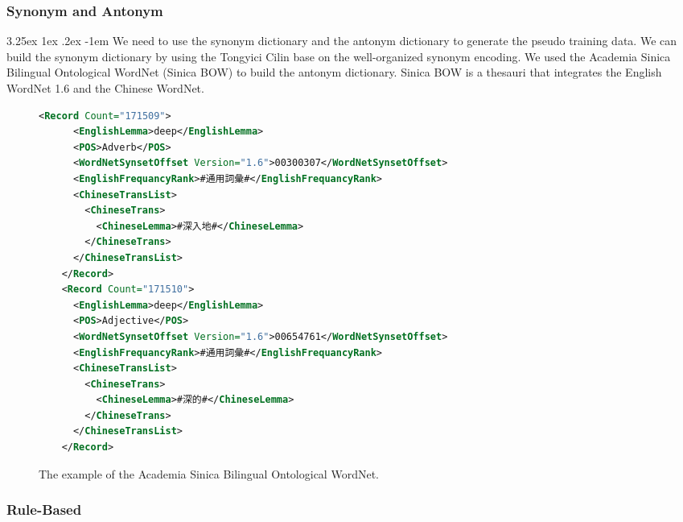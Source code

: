 \documentclass[12pt]{article}
\makeatletter
\renewcommand\paragraph{\@startsection{paragraph}{5}{\z@}%
  {3.25ex \@plus1ex \@minus.2ex}%
  {-1em}%
  {\normalfont\normalsize\bfseries}}
\makeatother
\begin{document}
\begin{CJK*}{UTF8}{bkai}
\begin{spacing}{1.77}
\subsubsection{Synonym and Antonym}
\paragraph{}
We need to use the synonym dictionary and the antonym dictionary to generate the pseudo training data. We can build the synonym dictionary by using the Tongyici Cilin base on the well-organized synonym encoding. We used the Academia Sinica Bilingual Ontological WordNet (Sinica BOW) \cite{huang2004sinica} to build the antonym dictionary. Sinica BOW is a thesauri that integrates the English WordNet 1.6 and the Chinese WordNet.

\begin{figure}
  \centering
  \caption{The example of the Academia Sinica Bilingual Ontological WordNet.}
  \begin{minipage}{\linewidth}
    \begin{lstlisting}[language=XML]
    <Record Count="171509">
      <EnglishLemma>deep</EnglishLemma>
      <POS>Adverb</POS>
      <WordNetSynsetOffset Version="1.6">00300307</WordNetSynsetOffset>
      <EnglishFrequancyRank>#通用詞彙#</EnglishFrequancyRank>
      <ChineseTransList>
        <ChineseTrans>
          <ChineseLemma>#深入地#</ChineseLemma>
        </ChineseTrans>
      </ChineseTransList>
    </Record>
    <Record Count="171510">
      <EnglishLemma>deep</EnglishLemma>
      <POS>Adjective</POS>
      <WordNetSynsetOffset Version="1.6">00654761</WordNetSynsetOffset>
      <EnglishFrequancyRank>#通用詞彙#</EnglishFrequancyRank>
      <ChineseTransList>
        <ChineseTrans>
          <ChineseLemma>#深的#</ChineseLemma>
        </ChineseTrans>
      </ChineseTransList>
    </Record>
    \end{lstlisting}
  \end{minipage}
\end{figure}

\subsubsection{Rule-Based}

\end{spacing}
\end{CJK*}
\end{document}

